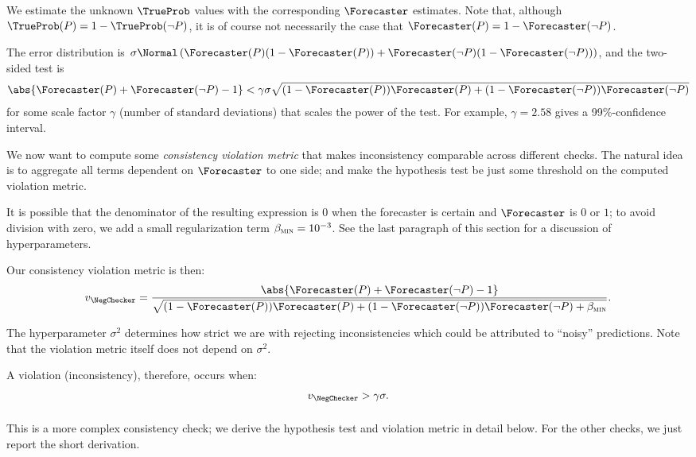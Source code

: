 We estimate the unknown $\TrueProb$ values with the corresponding $\Forecaster$ estimates.  Note that, although $\TrueProb(P) = 1- \TrueProb(\neg P)$, it is of course not necessarily the case that $\Forecaster(P) = 1- \Forecaster(\neg P)$.

The error distribution is $\sigma \Normal\left( \Forecaster(P) (1 - \Forecaster(P)) + \Forecaster(\neg P) (1 - \Forecaster(\neg P)) \right)$, and the two-sided test is
\begin{align*}
   \abs{\Forecaster(P) + \Forecaster(\neg P) - 1} < \gamma \sigma \sqrt{(1 - \Forecaster(P)) \Forecaster(P) + (1 - \Forecaster(\neg P)) \Forecaster(\neg P)}
\end{align*}
for some scale factor $\gamma$ (number of standard deviations) that scales the power of the test. For example, $\gamma = 2.58$ gives a 99\%-confidence interval.

We now want to compute some \emph{consistency violation metric} that makes inconsistency comparable across different checks. The natural idea is to aggregate all terms dependent on $\Forecaster$ to one side; and make the hypothesis test be just some threshold on the computed violation metric.

It is possible that the denominator of the resulting expression is $0$ when the forecaster is certain and $\Forecaster$ is $0$ or $1$; to avoid division with zero, we add a small regularization term $\beta_{\textsc{min}} = 10^{-3}$.
See the last paragraph of this section for a discussion of hyperparameters.

Our consistency violation metric is then:
\begin{align*}
    v_{\NegChecker}
    = \frac{\abs{\Forecaster(P) + \Forecaster(\neg P) - 1}}{\sqrt{(1 - \Forecaster(P)) \Forecaster(P) + (1 - \Forecaster(\neg P)) \Forecaster(\neg P) + \betamin}}.
\end{align*}

The hyperparameter $\sigma^2$ determines how strict we are with rejecting inconsistencies which could be attributed to ``noisy'' predictions. Note that the violation metric itself does not depend on $\sigma^2$.

A violation (inconsistency), therefore, occurs when:
\begin{align*}
    v_{\NegChecker} > \gamma \sigma.
\end{align*}

\paragraph{\CondCondChecker}
This is a more complex consistency check; we derive the hypothesis test and violation metric in detail below. For the other checks, we just report the short derivation.


